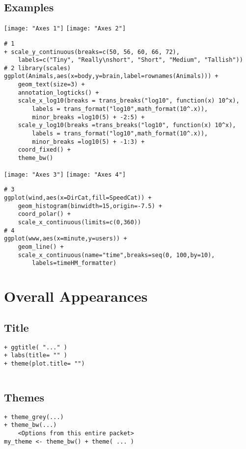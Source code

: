 \documentclass[]{article}
\begin{document}
\subsection{Examples}
\texttt{[image: "Axes 1"]}
\texttt{[image: "Axes 2"]} \\
\begin{verbatim}
# 1 
+ scale_y_continuous(breaks=c(50, 56, 60, 66, 72), 
	labels=c("Tiny", "Really\nshort", "Short", "Medium", "Tallish"))
# 2 library(scales)
ggplot(Animals,aes(x=body,y=brain,label=rownames(Animals))) + 
	geom_text(size=3) + 
	annotation_logticks() + 
	scale_x_log10(breaks = trans_breaks("log10", function(x) 10^x),  
		labels = trans_format("log10",math_format(10^.x)), 
		minor_breaks =log10(5) + -2:5) + 
	scale_y_log10(breaks =trans_breaks("log10", function(x) 10^x), 
		labels = trans_format("log10",math_format(10^.x)), 
		minor_breaks =log10(5) + -1:3) + 
	coord_fixed() + 
	theme_bw()
\end{verbatim}

\texttt{[image: "Axes 3"]}
\texttt{[image: "Axes 4"]} \\
\begin{verbatim}
# 3
ggplot(wind,aes(x=DirCat,fill=SpeedCat)) + 
	geom_histogram(binwidth=15,origin=-7.5) + 
	coord_polar() + 
	scale_x_continuous(limits=c(0,360))
# 4
ggplot(www,aes(x=minute,y=users)) +
	geom_line() + 
	scale_x_continuous(name="time",breaks=seq(0, 100,by=10),
		labels=timeHM_formatter)
\end{verbatim}

\section{Overall Appearances}

\subsection{Title}
\begin{verbatim}
+ ggtitle( "..." )
+ labs(title= "" )
+ theme(plot.title= "")
\end{verbatim}
\begin{tabular}{l l}
\end{tabular}

\subsection{Themes}
\begin{verbatim}
+ theme_grey(...)
+ theme_bw(...)
	<Options from this entire packet>
my_theme <- theme_bw() + theme( ... )
\end{verbatim}
\begin{tabular}{l l}
\end{tabular}
\end{document}
